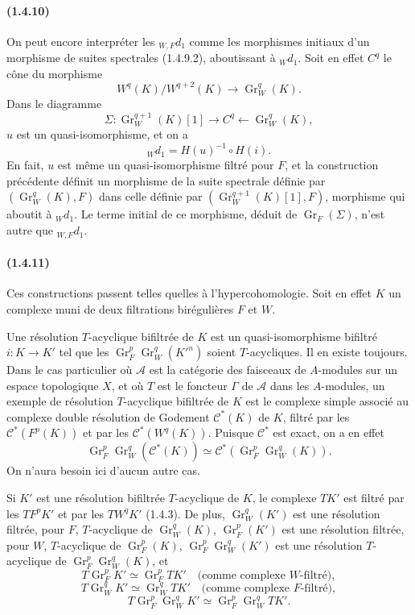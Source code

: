 \documentclass[10pt]{article}
\newcommand{\Gr}{\operatorname{Gr}}
\newcommand{\calA}{\mathcal A}
\begin{document}
\paragraph{(1.4.10)} On peut encore interpréter les ${}_{W,F}d_1$ comme les morphismes initiaux d'un morphisme de suites spectrales (1.4.9.2), aboutissant à ${}_Wd_1$. Soit en effet $C^q$ le cône du morphisme
\[
W^q(K)/W^{q+2}(K)\longrightarrow\Gr_W^q(K).
\]
Dans le diagramme
\[
\Sigma:\Gr_W^{q+1}(K)[1]\longrightarrow C^q\longleftarrow\Gr_W^q(K),
\]
$u$ est un quasi-isomorphisme, et on a
\[
{}_Wd_1=H(u)^{-1}\circ H(i).
\]
En fait, $u$ est même un quasi-isomorphisme filtré pour $F$, et la construction précédente définit un morphisme de la suite spectrale définie par $(\Gr_W^q(K),F)$ dans celle définie par $(\Gr_W^{q+1}(K)[1],F)$, morphisme qui aboutit à ${}_Wd_1$. Le terme initial de ce morphisme, déduit de $\Gr_F(\Sigma)$, n'est autre que ${}_{W,F}d_1$.

\paragraph{(1.4.11)} Ces constructions passent telles quelles à l'hypercohomologie. Soit en effet $K$ un complexe muni de deux filtrations birégulières $F$ et $W$.

Une résolution $T$-acyclique bifiltrée de $K$ est un quasi-isomorphisme bifiltré $i:K\to K'$ tel que les $\Gr_F^p\Gr_W^q(K'^n)$ soient $T$-acycliques. Il en existe toujours. Dans le cas particulier où $\calA$ est la catégorie des faisceaux de $A$-modules sur un espace topologique $X$, et où $T$ est le foncteur $\Gamma$ de $\calA$ dans les $A$-modules, un exemple de résolution $T$-acyclique bifiltrée de $K$ est le complexe simple associé au complexe double résolution de Godement $\mathcal C^*(K)$ de $K$, filtré par les $\mathcal C^*(F^p(K))$ et par les $\mathcal C^*(W^q(K))$. Puisque $\mathcal C^*$ est exact, on a en effet
\[
\Gr_F^p\Gr_W^q(\mathcal C^*(K))\simeq \mathcal C^*(\Gr_F^p\Gr_W^q(K)).
\]
On n'aura besoin ici d'aucun autre cas.

Si $K'$ est une résolution bifiltrée $T$-acyclique de $K$, le complexe $TK'$ est filtré par les $TF^pK'$ et par les $TW^qK'$ (1.4.3). De plus, $\Gr_W^q(K')$ est une résolution filtrée, pour $F$, $T$-acyclique de $\Gr_W^q(K)$, $\Gr_F^p(K')$ est une résolution filtrée, pour $W$, $T$-acyclique de $\Gr_F^p(K)$, $\Gr_F^p\Gr_W^q(K')$ est une résolution $T$-acyclique de $\Gr_F^p\Gr_W^q(K)$, et
\[
T\Gr_F^pK'\simeq\Gr_F^pTK'\quad\text{(comme complexe $W$-filtré)},
\]
\[
T\Gr_W^qK'\simeq\Gr_W^qTK'\quad\text{(comme complexe $F$-filtré)},
\]
\[
T\Gr_F^p\Gr_W^qK'\simeq\Gr_F^p\Gr_W^qTK'.
\]
\end{document}
